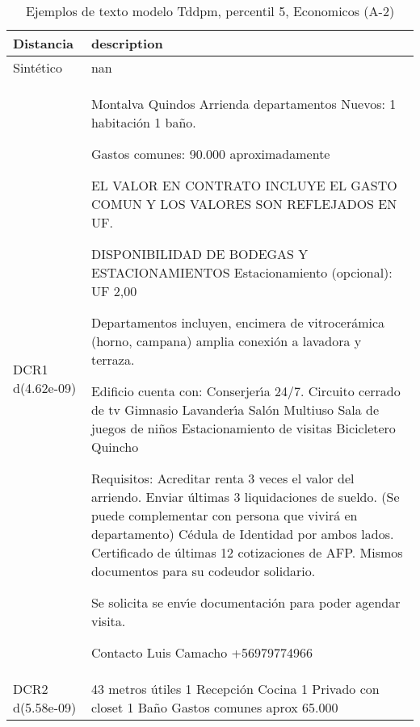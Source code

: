 \begin{table}[H]
\centering
\fontsize{10}{14}\selectfont
\caption{Ejemplos de texto modelo Tddpm, percentil 5, Economicos (A-2)}
\label{table-example-economicos-a-2-tddpm_mlp-5p-text}
\begin{tabular}{|l|m{35em}|}
\hline
\rowcolor[gray]{0.8}
Distancia & description \\
\hline Sintético & nan \\
\hline DCR1 d(4.62e-09) & Montalva Quindos Arrienda departamentos Nuevos: 1 habitaci\'on 1 ba\~no.

Gastos comunes: 90.000 aproximadamente

EL VALOR EN CONTRATO INCLUYE EL GASTO COMUN Y LOS VALORES SON REFLEJADOS EN UF. 

DISPONIBILIDAD DE BODEGAS Y ESTACIONAMIENTOS
Estacionamiento (opcional): UF 2,00

Departamentos incluyen, encimera de vitrocer\'amica (horno, campana) amplia conexi\'on a lavadora y terraza.

Edificio cuenta con:
Conserjer{\'\i}a 24/7.
Circuito cerrado de tv
Gimnasio
Lavander{\'\i}a
Sal\'on Multiuso
Sala de juegos de ni\~nos
Estacionamiento de visitas
Bicicletero
Quincho

Requisitos:
Acreditar renta 3 veces el valor del arriendo. Enviar \'ultimas 3 liquidaciones de sueldo. (Se puede complementar con persona que vivir\'a en departamento)
C\'edula de Identidad por ambos lados.
Certificado de \'ultimas 12 cotizaciones de AFP.
Mismos documentos para su codeudor solidario.

Se solicita se env{\'\i}e documentaci\'on para poder agendar visita.

Contacto
Luis Camacho
+56979774966 \\
\hline DCR2 d(5.58e-09) & 43 metros \'utiles 1 Recepci\'on Cocina 1 Privado con closet 1 Ba\~no Gastos comunes aprox 65.000 \\
\hline
\end{tabular}
\end{table}
